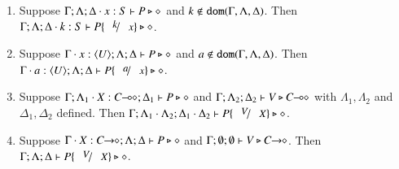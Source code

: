 \begin{lemma}\rm
	\label{l:subst}
	\begin{enumerate}[1.]
		\item	Suppose $\Gamma; \Lambda; \Delta \cdot x:S  \vdash P \triangleright \diamond$ and
			$k \not\in \mathtt{dom}(\Gamma, \Lambda, \Delta)$. 
			Then $\Gamma; \Lambda; \Delta \cat k:S  \vdash P\subst{k}{x} \hastype \Proc$.

		\item	Suppose $\Gamma \cdot x:\langle U \rangle; \Lambda; \Delta \vdash P \triangleright \diamond$ and
			$a \notin \mathtt{dom}(\Gamma, \Lambda, \Delta)$. 
			Then $\Gamma \cat a:\chtype{U}; \Lambda; \Delta   \vdash P\subst{a}{x} \hastype \Proc$.

		\item	Suppose $\Gamma; \Lambda_1 \cdot X:C\!\! \multimap\!\! \diamond; \Delta_1  \vdash P \triangleright \diamond$ 
			and $\Gamma; \Lambda_2; \Delta_2  \vdash V \triangleright C\!\! \multimap\!\! \diamond$ with 
			$\Lambda_1, \Lambda_2$ and $\Delta_1, \Delta_2$ defined.  
			Then $\Gamma; \Lambda_1 \cat \Lambda_2; \Delta_1 \cat \Delta_2  \proves P\subst{V}{X} \hastype \Proc$.

		\item	Suppose $\Gamma \cdot X:C\!\! \rightarrow\!\! \diamond; \Lambda; \Delta  \vdash P \triangleright \diamond$ and
			$\Gamma; \emptyset ; \emptyset  \vdash V \triangleright C\!\! \rightarrow\!\! \diamond$.
			Then $\Gamma; \Lambda; \Delta  \proves P\subst{V}{X} \hastype \Proc$.
		\end{enumerate}
\end{lemma}


